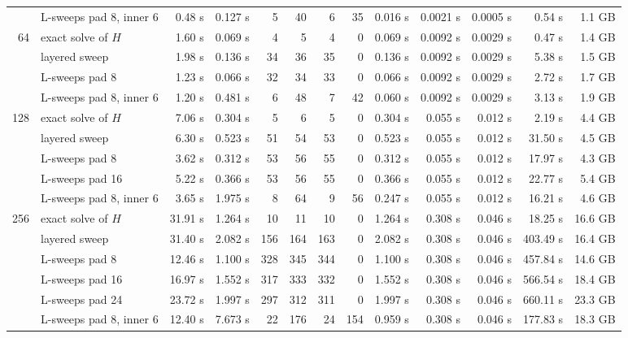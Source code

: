 \documentclass[11pt]{article}
\begin{document}
\begin{center}
\begin{tabular}{rlrrrrrrrrrrr}
 & L-sweeps pad 8, inner 6 & 0.48 s & 0.127 s & 5 & 40 & 6 & 35 & 0.016 s & 0.0021 s & 0.0005 s & 0.54 s & 1.1 GB \\
64 & exact solve of $H$ & 1.60 s & 0.069 s & 4 & 5 & 4 & 0 & 0.069 s & 0.0092 s & 0.0029 s & 0.47 s & 1.4 GB \\
 & layered sweep & 1.98 s & 0.136 s & 34 & 36 & 35 & 0 & 0.136 s & 0.0092 s & 0.0029 s & 5.38 s & 1.5 GB \\
 & L-sweeps pad 8 & 1.23 s & 0.066 s & 32 & 34 & 33 & 0 & 0.066 s & 0.0092 s & 0.0029 s & 2.72 s & 1.7 GB \\
 & L-sweeps pad 8, inner 6 & 1.20 s & 0.481 s & 6 & 48 & 7 & 42 & 0.060 s & 0.0092 s & 0.0029 s & 3.13 s & 1.9 GB \\
128 & exact solve of $H$ & 7.06 s & 0.304 s & 5 & 6 & 5 & 0 & 0.304 s & 0.055 s & 0.012 s & 2.19 s & 4.4 GB \\
 & layered sweep & 6.30 s & 0.523 s & 51 & 54 & 53 & 0 & 0.523 s & 0.055 s & 0.012 s & 31.50 s & 4.5 GB \\
 & L-sweeps pad 8 & 3.62 s & 0.312 s & 53 & 56 & 55 & 0 & 0.312 s & 0.055 s & 0.012 s & 17.97 s & 4.3 GB \\
 & L-sweeps pad 16 & 5.22 s & 0.366 s & 53 & 56 & 55 & 0 & 0.366 s & 0.055 s & 0.012 s & 22.77 s & 5.4 GB \\
 & L-sweeps pad 8, inner 6 & 3.65 s & 1.975 s & 8 & 64 & 9 & 56 & 0.247 s & 0.055 s & 0.012 s & 16.21 s & 4.6 GB \\
256 & exact solve of $H$ & 31.91 s & 1.264 s & 10 & 11 & 10 & 0 & 1.264 s & 0.308 s & 0.046 s & 18.25 s & 16.6 GB \\
 & layered sweep & 31.40 s & 2.082 s & 156 & 164 & 163 & 0 & 2.082 s & 0.308 s & 0.046 s & 403.49 s & 16.4 GB \\
 & L-sweeps pad 8 & 12.46 s & 1.100 s & 328 & 345 & 344 & 0 & 1.100 s & 0.308 s & 0.046 s & 457.84 s & 14.6 GB \\
 & L-sweeps pad 16 & 16.97 s & 1.552 s & 317 & 333 & 332 & 0 & 1.552 s & 0.308 s & 0.046 s & 566.54 s & 18.4 GB \\
 & L-sweeps pad 24 & 23.72 s & 1.997 s & 297 & 312 & 311 & 0 & 1.997 s & 0.308 s & 0.046 s & 660.11 s & 23.3 GB \\
 & L-sweeps pad 8, inner 6 & 12.40 s & 7.673 s & 22 & 176 & 24 & 154 & 0.959 s & 0.308 s & 0.046 s & 177.83 s & 18.3 GB \\
\bottomrule
\end{tabular}\\[5pt]
\begin{minipage}{\textwidth}\footnotesize

\end{minipage}
\end{center}
\end{document}
